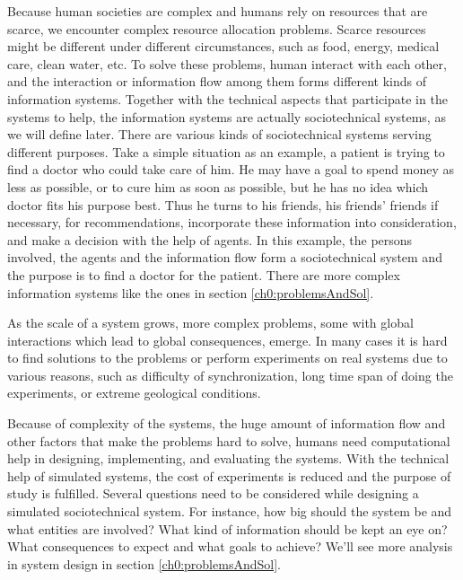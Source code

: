 Because human societies are complex and humans rely on resources that are scarce, we encounter complex resource allocation problems. Scarce resources might be different under different circumstances, such as food, energy, medical care, clean water, etc. To solve these problems, human interact with each other, and the interaction or information flow among them forms different kinds of information systems. Together with the technical aspects that participate in the systems to help, the information systems are actually sociotechnical systems, as we will define later. There are various kinds of sociotechnical systems serving different purposes. Take a simple situation as an example, a patient is trying to find a doctor who could take care of him. He may have a goal to spend money as less as possible, or to cure him as soon as possible, but he has no idea which doctor fits his purpose best. Thus he turns to his friends, his friends' friends if necessary, for recommendations, incorporate these information into consideration, and make a decision with the help of agents. In this example, the persons involved, the agents and the information flow form a sociotechnical system and the purpose is to find a doctor for the patient. There are more complex information systems like the ones in section \ref{ch0:problemsAndSol}. 

As the scale of a system grows, more complex problems, some with global interactions which lead to global consequences, emerge. In many cases it is hard to find solutions to the problems or perform experiments on real systems due to various reasons, such as difficulty of synchronization, long time span of doing the experiments, or extreme geological conditions.

Because of complexity of the systems, the huge amount of information flow and other factors that make the problems hard to solve, humans need computational help in designing, implementing, and evaluating the systems. With the technical help of simulated systems, the cost of experiments is reduced and the purpose of study is fulfilled. Several questions need to be considered while designing a simulated sociotechnical system. For instance, how big should the system be and what entities are involved? What kind of information should be kept an eye on? What consequences to expect and what goals to achieve? We'll see more analysis in system design in section \ref{ch0:problemsAndSol}. 

